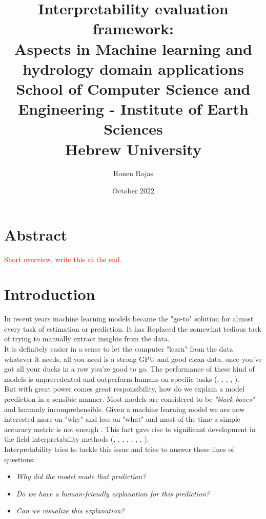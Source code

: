 \documentclass[12pt]{report}
\title{
	{Interpretability evaluation framework: \\ Aspects in Machine learning and hydrology domain applications}\\
	{\large School of Computer Science and Engineering - 
		Institute of Earth Sciences}\\
	{\large Hebrew University}
}
\author{Ronen Rojas}
\date{October 2022}
\begin{document}
\maketitle
\tableofcontents
\newpage

\chapter{Abstract} 

\textcolor{red}{Short overview, write this at the end.}



\newpage
\chapter{Introduction} 

In recent years machine learning models became the "go-to" solution for almost every task of estimation or prediction. It has Replaced the somewhat tedious task of trying to manually extract insights from the data.\\

It is definitely easier in a sense to let the computer "learn" from the data whatever it needs, all you need is a strong GPU and good clean data, once you've got all your ducks in a row you're good to go. The performance of these kind of models is unprecedented and outperform humans on specific tasks (\cite{he2015deep}, \cite{DBLP:journals/corr/abs-1805-01890}, \cite{DBLP:journals/corr/abs-1905-01392}, \cite{DBLP:journals/corr/MnihKSGAWR13}, \cite{Silver_2016}).\\

But with great power comes great responsibility, how do we explain a model prediction in a sensible manner. Most models are considered to be \textit{"black boxes"} and humanly incomprehensible. Given a machine learning model we are now interested more on "why" and less on "what" and most of the time a simple accuracy metric is not enough . This fact gave rise to significant development in the field interpretability methods (\cite{molnar2019}, \cite{electronics10050593}, \cite{DBLP:journals/corr/abs-2012-14261}, \cite{DBLP:journals/corr/abs-1802-00614}, \cite{DBLP:journals/corr/abs-2003-07631}, \cite{DBLP:journals/corr/abs-2007-15911}, \cite{samek2019explainable}, \cite{DBLP:journals/corr/abs-2012-15445}). \\

Interpretability tries to tackle this issue and tries to answer these lines of questions:
\begin{itemize}
	\item \textit{Why did the model made that prediction?}	
	\item \textit{Do we have a human-friendly explanation for this prediction?}	
	\item \textit{Can we visualize this explanation? }	
\end{itemize}
\end{document}
